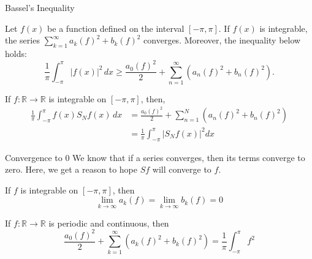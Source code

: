 \documentclass{beamer}
\begin{document}
\begin{frame}{Bassel's Inequality }

    \begin{theorem}\label{bassel inequality}
Let $f(x)$ be a function defined on the interval $[-\pi, \pi]$. If $f(x)$ is integrable, the series $\sum_{k=1}^{\infty}a_k(f)^2 + b_k(f)^2$ converges. Moreover, the inequality below holds:
\begin{equation*}
    \frac{1}{\pi} \int_{-\pi}^{\pi} |f(x)|^2 \, dx \geq \frac{a_0(f)^2}{2} + \sum_{n=1}^{\infty} \left(a_n(f)^2 + b_n(f)^2\right).
\end{equation*}
\end{theorem}

\begin{lemma}\label{lemma needed to prove basels inequality}
     If $f: \mathbb{R} \to \mathbb{R}$ is integrable on $[-\pi, \pi]$, then,
     \begin{equation*}
     \begin{aligned}
         \frac{1}{\pi} \int_{-\pi}^{\pi} f(x)S_Nf(x) \, dx
         &= \frac{a_0(f)^2}{2} + \sum_{n=1}^{N} \left(a_n(f)^2 +
         b_n(f)^2\right)\\
         &=  \frac{1}{\pi} \int_{-\pi}^{\pi} |S_Nf(x)|^2  dx
     \end{aligned}
     \end{equation*}
 \end{lemma}
    
\end{frame}




\begin{frame}{Convergence to 0}
    \small
    We know that if a series converges, then its terms converge to zero. Here, we get a reason to hope $Sf$ will converge to $f$.
    \begin{theorem}
        If $f$ is integrable on $[-\pi,\pi]$, then
        \[
        \lim_{k \to \infty}a_k(f)  = \lim_{k \to \infty}b_k(f) = 0
        \]
    \end{theorem}

    \begin{theorem}
        If $f: \mathbb{R} \to \mathbb{R}$ is periodic and continuous, then
        \[
        \frac{a_0(f)^2}{2} + \sum_{k = 1}^{\infty}(a_k(f)^2 + b_k(f)^2) = \frac{1}{\pi}\int_{-\pi}^{\pi}f^2
        \]
    \end{theorem}
\end{frame}
\end{document}
